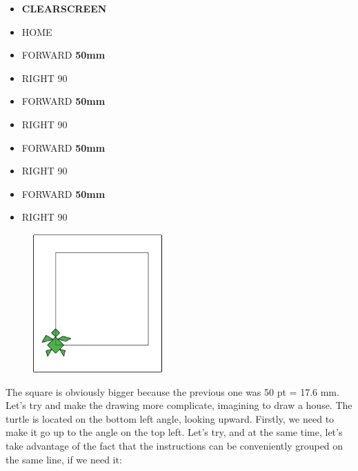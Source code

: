\vskip 1cm

\begin{scriptsize}
\begin{minipage}{0.45\textwidth}
\begin{itemize}[itemsep=-3pt,parsep=2pt]
\item[] \hspace{0.5cm} \textbf{CLEARSCREEN}
\item[] \hspace{0.5cm} HOME
\item[] \hspace{0.5cm} FORWARD \textbf{50mm}
\item[] \hspace{0.5cm} RIGHT 90
\item[] \hspace{0.5cm} FORWARD \textbf{50mm}
\item[] \hspace{0.5cm} RIGHT 90
\item[] \hspace{0.5cm} FORWARD \textbf{50mm}
\item[] \hspace{0.5cm} RIGHT 90
\item[] \hspace{0.5cm} FORWARD \textbf{50mm} 
\item[] \hspace{0.5cm} RIGHT 90     
\end{itemize}
\end{minipage}
\end{scriptsize}
\begin{minipage}{0.5\textwidth}
\begin{figure}[H]
   \includegraphics[width=5.0cm,trim=4 4 8 4,clip]{./images/disegnare/disegnare-4.png}
   \label{dis-4}
\end{figure}
\end{minipage} \hfill

\vskip 1cm

The square is obviously bigger because the previous one was 50 pt = 17.6 mm. 
Let's try and make the drawing more complicate, imagining to draw a house. The turtle is located on the bottom left angle, looking upward. 
Firstly, we need to make it go up to the angle on the top left. Let's try, and at the same time, let's take advantage of the fact that the instructions can be conveniently grouped on the same line, if we need it:

